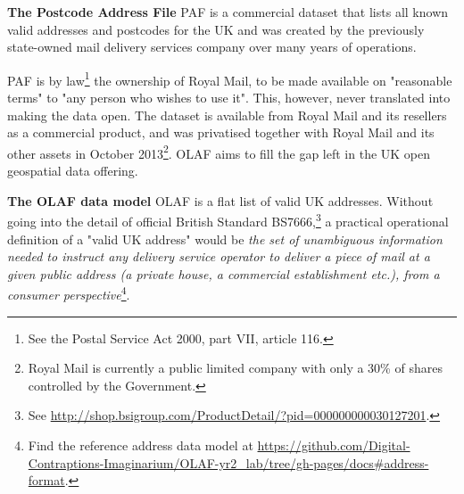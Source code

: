 \textbf{The Postcode Address File} PAF is a commercial dataset that lists all known valid addresses and postcodes for the UK and was created by the previously state-owned mail delivery services company over many years of operations.

PAF is by law\footnote{See the Postal Service Act 2000, part VII, article 116.} the ownership of Royal Mail, to be made available on "reasonable terms" to "any person who wishes to use it". This, however, never translated into making the data open. The dataset is available from Royal Mail and its resellers as a commercial product, and was privatised together with Royal Mail and its other assets in October 2013\footnote{Royal Mail is currently a public limited company with only a 30\% of shares controlled by the Government.}. OLAF aims to fill the gap left in the UK open geospatial data offering. 

\textbf{The OLAF data model} OLAF is a flat list of valid UK addresses. Without going into the detail of official British Standard BS7666,\footnote{See \url{http://shop.bsigroup.com/ProductDetail/?pid=000000000030127201}.} a practical operational definition of a "valid UK address" would be {\it the set of unambiguous information needed to instruct any delivery service operator to deliver a piece of mail at a given public address (a private house, a commercial establishment etc.), from a consumer perspective}\footnote{Find the reference address data model at \url{https://github.com/Digital-Contraptions-Imaginarium/OLAF-yr2_lab/tree/gh-pages/docs#address-format}.}. 
